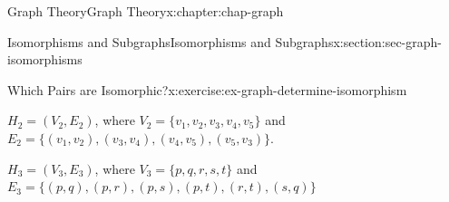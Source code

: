 \documentclass[oneside,10pt,]{book}
\numberwithin{equation}{section}
\begin{document}
\begin{chapterptx}{Graph Theory}{}{Graph Theory}{}{}{x:chapter:chap-graph}
\begin{sectionptx}{Isomorphisms and Subgraphs}{}{Isomorphisms and Subgraphs}{}{}{x:section:sec-graph-isomorphisms}
\begin{inlineexercise}{Which Pairs are Isomorphic?}{x:exercise:ex-graph-determine-isomorphism}
\begin{sidebyside}{2}{0.055}{0.055}{0.11}
\begin{sbspanel}{0.18}
{
}%
\end{sbspanel}%
\begin{sbspanel}{0.6}%
\(H_2 = (V_2,E_2)\), where \(V_2 = \{v_1,v_2,v_3,v_4,v_5\}\) and \(E_2 = \{(v_1,v_2),(v_3,v_4),(v_4,v_5),(v_5,v_3)\}\).%
\end{sbspanel}%
\end{sidebyside}%
\begin{sidebyside}{2}{0.0425}{0.0425}{0.085}%
\begin{sbspanel}{0.6}%
\(H_3 = (V_3,E_3)\), where \(V_3 = \{p,q,r,s,t\}\) and \(E_3 = \{(p,q),(p,r),(p,s),(p,t),(r,t),(s,q)\}\)%
\end{sbspanel}%
\begin{sbspanel}{0.23}%
\end{sbspanel}
\end{sidebyside}
\end{inlineexercise}
\end{sectionptx}
\end{chapterptx}
\end{document}
